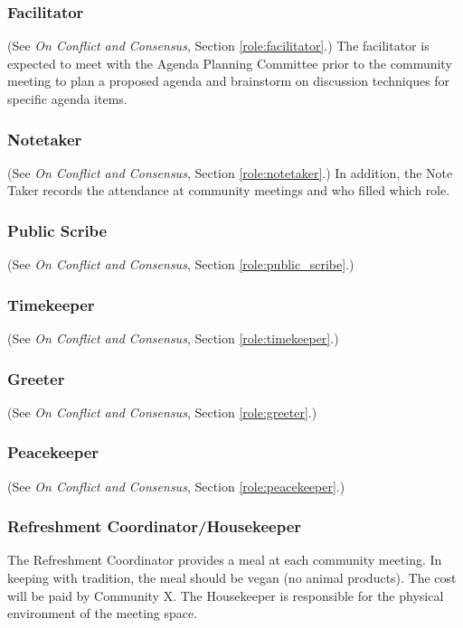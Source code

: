 \subsubsection*{Facilitator}
(See \emph{On Conflict and Consensus}, Section \ref{role:facilitator}.) The facilitator is expected to meet with the Agenda Planning Committee prior to the community meeting to plan a proposed agenda and brainstorm on discussion techniques for specific agenda items.

\subsubsection*{Notetaker}
(See \emph{On Conflict and Consensus}, Section \ref{role:notetaker}.) In addition, the Note Taker records the attendance at community meetings and who filled which role.

\subsubsection*{Public Scribe} %
(See \emph{On Conflict and Consensus}, Section \ref{role:public_scribe}.)

\subsubsection*{Timekeeper}
(See \emph{On Conflict and Consensus}, Section \ref{role:timekeeper}.)

\subsubsection*{Greeter}
(See \emph{On Conflict and Consensus}, Section \ref{role:greeter}.)

\subsubsection*{Peacekeeper}
(See \emph{On Conflict and Consensus}, Section \ref{role:peacekeeper}.)

\subsubsection*{Refreshment Coordinator/Housekeeper}
The Refreshment Coordinator provides a meal at each community meeting. In keeping with tradition, the meal should be vegan (no animal products). The cost will be paid by Community X. The Housekeeper is responsible for the physical environment of the meeting space.

